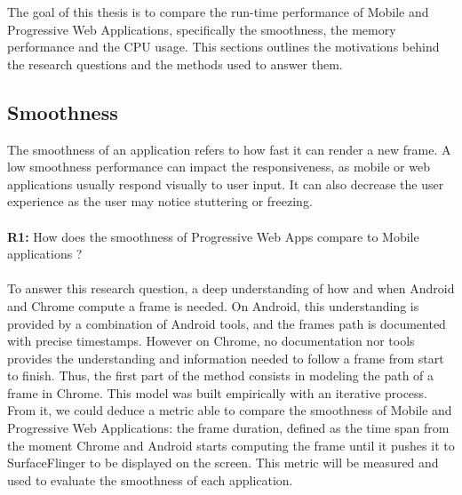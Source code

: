 \documentclass{kththesis}
\begin{document}
The goal of this thesis is to compare the run-time performance of Mobile and Progressive Web Applications, specifically the smoothness, the memory performance and the CPU usage. This sections outlines the motivations behind the research questions and the methods used to answer them.


\subsection{Smoothness}

The smoothness of an application refers to how fast it can render a new frame. A low smoothness performance can impact the responsiveness, as mobile or web applications usually respond visually to user input. It can also decrease the user experience as the user may notice stuttering or freezing. 

\paragraph{}
\textbf{R1:} How does the smoothness of Progressive Web Apps compare to Mobile applications ?

\paragraph{}
To answer this research question, a deep understanding of how and when Android and Chrome compute a frame is needed. On Android, this understanding is provided by a combination of Android tools, and the frames path is documented with precise timestamps. However on Chrome, no documentation nor tools provides the understanding and information needed to follow a frame from start to finish. Thus, the first part of the method consists in modeling the path of a frame in Chrome. This model was built empirically with an iterative process. From it, we could deduce a metric able to compare the smoothness of Mobile and Progressive Web Applications: the frame duration, defined as the time span from the moment Chrome and Android starts computing the frame until it pushes it to SurfaceFlinger to be displayed on the screen. This metric will be measured and used to evaluate the smoothness of each application.

\end{document}
